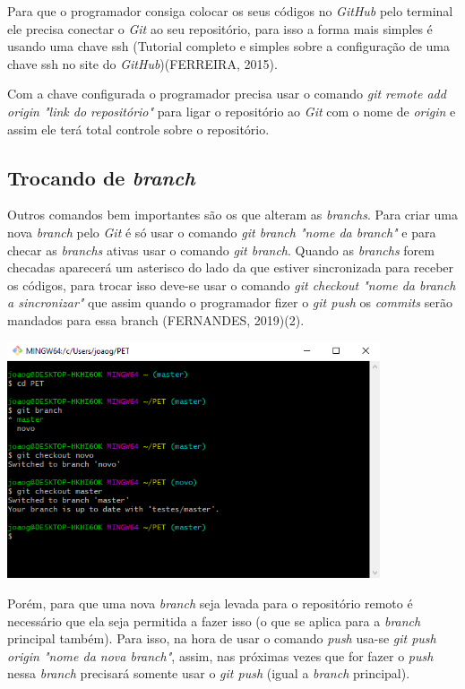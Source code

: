 \documentclass{article}
\begin{document}
\hspace{4mm}Para que o programador consiga colocar os seus códigos no \textit{GitHub} pelo terminal ele precisa conectar o \textit{Git} ao seu repositório, para isso a forma mais simples é usando uma chave ssh (Tutorial completo e simples sobre a configuração de uma chave ssh no site do \textit{GitHub})(FERREIRA, 2015).

Com a chave configurada o programador precisa usar o comando \textit{git remote add origin "link do repositório"} para ligar o repositório ao \textit{Git} com o nome de \textit{origin} e assim ele terá total controle sobre o repositório.

\subsection{Trocando de \textit{branch}}
Outros comandos bem importantes são os que alteram as \textit{branchs}. Para criar uma nova \textit{branch} pelo \textit{Git} é só usar o comando \textit{git branch "nome da branch"} e para checar as \textit{branchs} ativas usar o comando \textit{git branch}. Quando as \textit{branchs} forem checadas aparecerá um asterisco do lado da que estiver sincronizada para receber os códigos, para trocar isso deve-se usar o comando \textit{git checkout "nome da branch a sincronizar"} que assim quando o programador fizer o \textit{git push} os \textit{commits} serão mandados para essa branch (FERNANDES, 2019)(2). 

\includegraphics[width = 11cm]{images/branch.png}

Porém, para que uma nova \textit{branch} seja levada para o repositório remoto é necessário que ela seja permitida a fazer isso (o que se aplica para a \textit{branch} principal também). Para isso, na hora de usar o comando \textit{push} usa-se \textit{git push origin "nome da nova branch"}, assim, nas próximas vezes que for fazer o \textit{push} nessa \textit{branch} precisará somente usar o \textit{git push} (igual a \textit{branch} principal).  
\end{document}
